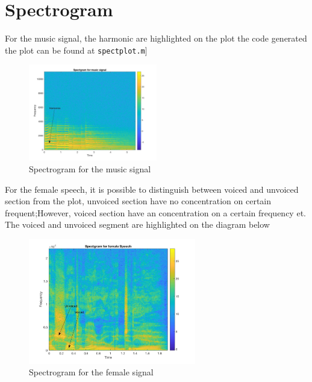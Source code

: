 \documentclass{article}
\begin{document}
    \section{Spectrogram}
    For the music signal, the harmonic are highlighted on the plot the code generated the plot can be found at \texttt{spectplot.m}]
    \begin{figure}[H]
        \begin{center}
            \leavevmode
            \includegraphics[width=0.5\textwidth]{spectgram_music.jpg}
        \end{center}
        \caption{Spectrogram for the music signal}
    \end{figure}
    For the female speech, it is possible to distinguish between voiced and unvoiced section from the plot, unvoiced section have no concentration on certain frequent;However, voiced section have an concentration on a certain frequency
    et. The voiced and unvoiced segment are highlighted on the diagram below
    \begin{figure}[H]
        \begin{center}
            \leavevmode
            \includegraphics[width=0.65\textwidth]{spect_female.jpg}
        \end{center}
        \caption{Spectrogram for the female signal}
        \label{euler:1}
    \end{figure}
    \newpage
\end{document}
